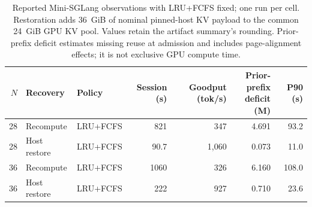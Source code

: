 \begin{table}[t]
  \centering
  \small
  \begin{tabular}{rllrrrr}
    \toprule
    $N$ & Recovery & Policy & Session (s) & Goodput (tok/s) & \shortstack{Prior-prefix\\deficit (M)} & P90 (s) \\
    \midrule
    28 & Recompute & LRU+FCFS & 821 & 347 & 4.691 & 93.2 \\
    28 & Host restore & LRU+FCFS & 90.7 & 1,060 & 0.073 & 11.0 \\
    36 & Recompute & LRU+FCFS & 1060 & 326 & 6.160 & 108.0 \\
    36 & Host restore & LRU+FCFS & 222 & 927 & 0.710 & 23.6 \\
    \bottomrule
  \end{tabular}
  \caption{Reported Mini-SGLang observations with LRU+FCFS fixed; one run per cell. Restoration adds 36~GiB of nominal pinned-host KV payload to the common 24~GiB GPU KV pool. Values retain the artifact summary's rounding. Prior-prefix deficit estimates missing reuse at admission and includes page-alignment effects; it is not exclusive GPU compute time.}
  \label{tab:host-restore-results}
\end{table}
